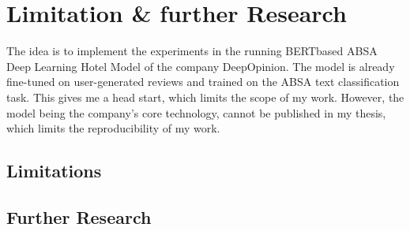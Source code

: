 \section{Limitation & further Research}


The idea is to implement the experiments in the running BERTbased ABSA Deep Learning Hotel Model of the company DeepOpinion. The model is already fine-tuned on user-generated reviews and trained on the ABSA text classification task. This gives me a head start, which limits the scope of my work. However, the model being the company's core technology, cannot be published in my thesis, which limits the reproducibility of my work.


\subsection{Limitations}


\subsection{Further Research}




